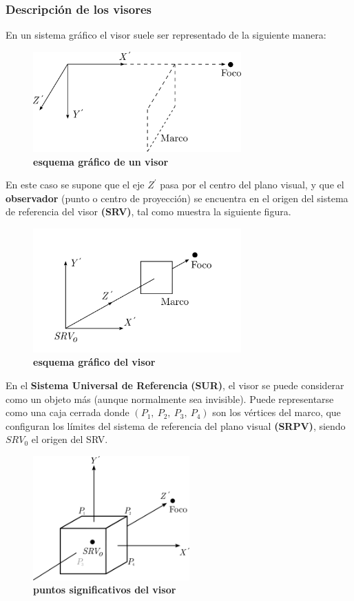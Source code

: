 \subsubsection{Descripción de los visores}
En un sistema gráfico el visor suele ser representado de la siguiente manera:

\begin{figure}[h]
\includegraphics[width=8cm]{Img/GEO/geo-visor0.png}
\centering
    \caption{\footnotesize{\textbf{esquema gráfico de un visor}}}
    \label{geo-visor0}
\end{figure}

En este caso se supone que el eje $Z^{\prime}$ pasa por el centro del plano visual, y que el \textbf{observador} (punto o centro de proyección) se encuentra en el origen del sistema de referencia del visor \textbf{(SRV)}, tal como muestra la siguiente figura.

\begin{figure}[h]
\includegraphics[width=8cm]{Img/GEO/geo-visor-1.png}
\centering
    \caption{\footnotesize{\textbf{esquema gráfico del visor}}}
    \label{geo-visor1}
\end{figure}

En el \textbf{Sistema Universal de Referencia} \textbf{(SUR)}, el visor se puede considerar como un objeto más (aunque normalmente sea invisible). Puede representarse como una caja cerrada donde $(P_1, \ P_2, \ P_3, \ P_4)$ son los vértices del marco, que configuran los límites del sistema de referencia del plano visual \textbf{(SRPV)}, siendo $SRV_0$ el origen del SRV.

\begin{figure}[h]
\includegraphics[width=6cm]{Img/GEO/geo-visor-2.png}
\centering
    \caption{\footnotesize{\textbf{puntos significativos del visor}}}
    \label{geo-visor2}
\end{figure}

